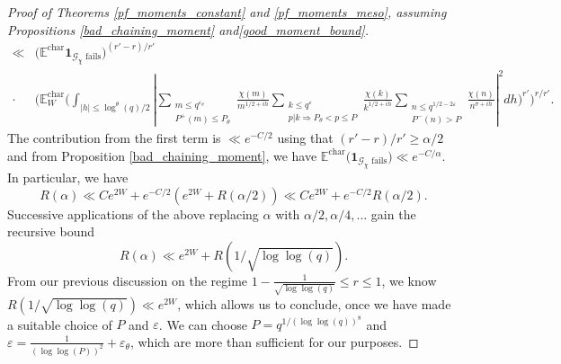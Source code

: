 \documentclass[10pt,a4paper]{amsart}
\numberwithin{equation}{section}
\begin{document}
\begin{proof}[Proof of Theorems \ref{pf_moments_constant} and \ref{pf_moments_meso}, assuming Propositions \ref{bad_chaining_moment} and\ref{good_moment_bound}]
\begin{align*}
        \ll& \big(\mathbb{E}^{\text{char}}\mathbf{1}_{\mathcal{G}_\chi \text{ fails}}\big)^{(r'-r)/r'} \\
        \cdot& \big(\mathbb{E}_W^{\text{char}}\big(\int_{|h|\leq \log^\theta(q)/2}|\sum_{\substack{m \leq q^{\varepsilon_\theta} \\ P^+(m) \leq P_\theta}}\frac{\chi(m)}{m^{1/2+ih}}\sum_{\substack{k \leq q^{\varepsilon} \\ p|k \Rightarrow P_\theta < p \leq P}}\frac{\chi(k)}{k^{1/2+ih}}\sum_{\substack{n \leq q^{1/2-2\varepsilon} \\ P^{-}(n) > P}}\frac{\chi(n)}{n^{\sigma+ih}}|^2dh\big)^{r'}\big)^{r/r'}.
    \end{align*}
    The contribution from the first term is $\ll e^{-C/2}$ using that $(r'-r)/r' \geq \alpha/2$ and from Proposition \ref{bad_chaining_moment}, we have $\mathbb{E}^{\text{char}}\big(\mathbf{1}_{\mathcal{G}_\chi \text{ fails}}\big) \ll e^{-C/\alpha}$. In particular, we have
    $$R(\alpha) \ll Ce^{2W} + e^{-C/2}(e^{2W}+R(\alpha/2)) \ll Ce^{2W} + e^{-C/2}R(\alpha/2).$$
    Successive applications of the above replacing $\alpha$ with $\alpha/2, \alpha/4,...$ gain the recursive bound
    $$R(\alpha) \ll e^{2W}+R(1/\sqrt{\log\log(q)}).$$
    From our previous discussion on the regime $1-\frac{1}{\sqrt{\log\log(q)}} \leq r \leq 1$, we know $R(1/\sqrt{\log\log(q)}) \ll e^{2W}$, which allows us to conclude, once we have made a suitable choice of $P$ and $\varepsilon$. We can choose $P=q^{1/(\log\log(q))^8}$ and $\varepsilon = \frac{1}{(\log\log(P))^2}+\varepsilon_\theta$, which are more than sufficient for our purposes.
\end{proof}
\end{document}
